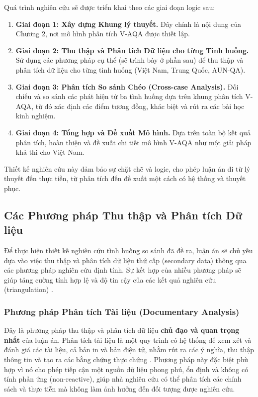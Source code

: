 \documentclass[12pt, a4paper, openany]{report}
\begin{document}
Quá trình nghiên cứu sẽ được triển khai theo các giai đoạn logic sau:
\begin{enumerate}
    \item \textbf{Giai đoạn 1: Xây dựng Khung lý thuyết.} Đây chính là nội dung của Chương 2, nơi mô hình phân tích V-AQA được thiết lập.
    \item \textbf{Giai đoạn 2: Thu thập và Phân tích Dữ liệu cho từng Tình huống.} Sử dụng các phương pháp cụ thể (sẽ trình bày ở phần sau) để thu thập và phân tích dữ liệu cho từng tình huống (Việt Nam, Trung Quốc, AUN-QA).
    \item \textbf{Giai đoạn 3: Phân tích So sánh Chéo (Cross-case Analysis).} Đối chiếu và so sánh các phát hiện từ ba tình huống dựa trên khung phân tích V-AQA, từ đó xác định các điểm tương đồng, khác biệt và rút ra các bài học kinh nghiệm.
    \item \textbf{Giai đoạn 4: Tổng hợp và Đề xuất Mô hình.} Dựa trên toàn bộ kết quả phân tích, hoàn thiện và đề xuất chi tiết mô hình V-AQA như một giải pháp khả thi cho Việt Nam.
\end{enumerate}

Thiết kế nghiên cứu này đảm bảo sự chặt chẽ và logic, cho phép luận án đi từ lý thuyết đến thực tiễn, từ phân tích đến đề xuất một cách có hệ thống và thuyết phục.

\subsection{Các Phương pháp Thu thập và Phân tích Dữ liệu}
\label{subsec:phuong_phap_cu_the}

Để thực hiện thiết kế nghiên cứu tình huống so sánh đã đề ra, luận án sẽ chủ yếu dựa vào việc thu thập và phân tích dữ liệu thứ cấp (secondary data) thông qua các phương pháp nghiên cứu định tính. Sự kết hợp của nhiều phương pháp sẽ giúp tăng cường tính hợp lệ và độ tin cậy của các kết quả nghiên cứu (triangulation) \cite{DenzinLincoln2011}.

\subsubsection{Phương pháp Phân tích Tài liệu (Documentary Analysis)}
\label{subsubsec:phan_tich_tai_lieu}

Đây là phương pháp thu thập và phân tích dữ liệu \textbf{chủ đạo và quan trọng nhất} của luận án. Phân tích tài liệu là một quy trình có hệ thống để xem xét và đánh giá các tài liệu, cả bản in và bản điện tử, nhằm rút ra các ý nghĩa, thu thập thông tin và tạo ra các bằng chứng thực chứng \cite{Bowen2009}. Phương pháp này đặc biệt phù hợp vì nó cho phép tiếp cận một nguồn dữ liệu phong phú, ổn định và không có tính phản ứng (non-reactive), giúp nhà nghiên cứu có thể phân tích các chính sách và thực tiễn mà không làm ảnh hưởng đến đối tượng được nghiên cứu.
\end{document}

